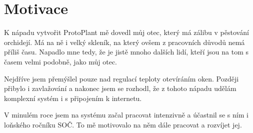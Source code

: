 \chapter{Motivace}
K nápadu vytvořit ProtoPlant mě dovedl můj otec, který má zálibu v pěstování orchidejí.
Má na ně i velký skleník, na který ovšem z pracovních důvodů nemá příliš času.
Napadlo mne tedy, že je jistě mnoho dalších lidí, kteří jsou na tom s časem velmi podobně, jako můj otec.

Nejdříve jsem přemýšlel pouze nad regulací teploty otevíráním oken.
Později přibylo i zavlažování a nakonec jsem se rozhodl, že z tohoto nápadu udělám komplexní systém i s připojením k internetu.

V minulém roce jsem na systému začal pracovat intenzivně a účastnil se s ním i loňského ročníku SOČ.
To mě motivovalo na něm dále pracovat a rozvíjet jej.

\newpage